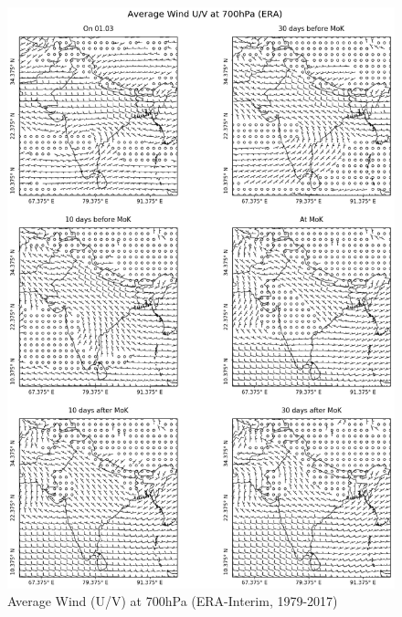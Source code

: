 \begin{figure}[h]
  \centering
  \includegraphics[width=\linewidth]{./99_appendix/img/wind_avg}
  \caption{Average Wind (U/V) at 700hPa (ERA-Interim, 1979-2017)}
  \label{apx:era_wind}
\end{figure}


